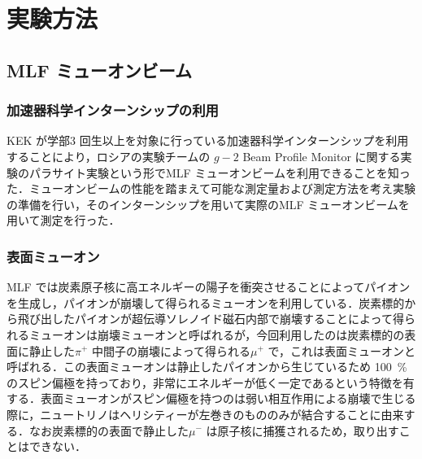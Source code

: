 



%

\section{実験方法}

\subsection{MLF ミューオンビーム}

\subsubsection{加速器科学インターンシップの利用}
KEK が学部3 回生以上を対象に行っている加速器科学インターンシップを利用することにより，ロシアの実験チームの $g - 2$ Beam Profile Monitor に関する実験のパラサイト実験という形でMLF ミューオンビームを利用できることを知った．ミューオンビームの性能を踏まえて可能な測定量および測定方法を考え実験の準備を行い，そのインターンシップを用いて実際のMLF ミューオンビームを用いて測定を行った．

 \subsubsection{表面ミューオン}
 MLF では炭素原子核に高エネルギーの陽子を衝突させることによってパイオンを生成し，パイオンが崩壊して得られるミューオンを利用している．炭素標的から飛び出したパイオンが超伝導ソレノイド磁石内部で崩壊することによって得られるミューオンは崩壊ミューオンと呼ばれるが，今回利用したのは炭素標的の表面に静止した$\pi^{+}$ 中間子の崩壊によって得られる$\mu ^{+}$ で，これは表面ミューオンと呼ばれる．この表面ミューオンは静止したパイオンから生じているため 100~\% のスピン偏極を持っており，非常にエネルギーが低く一定であるという特徴を有する．表面ミューオンがスピン偏極を持つのは弱い相互作用による崩壊で生じる際に，ニュートリノはヘリシティーが左巻きのもののみが結合することに由来する．なお炭素標的の表面で静止した$\mu^-$ は原子核に捕獲されるため，取り出すことはできない．


